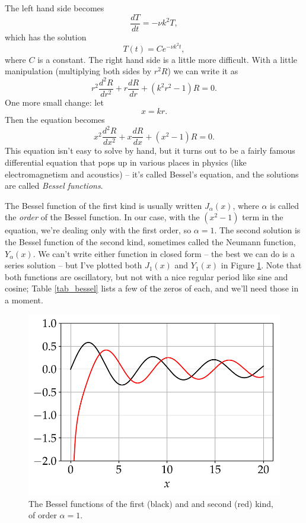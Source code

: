 The left hand side becomes
\[
 \frac{dT}{dt} = -\nu k^2 T,
\]
which has the solution
\begin{equation}
T(t) = C e^{-\nu k^2 t},
\end{equation}
where $C$ is a constant.  The right hand side is a little more difficult.  With a little manipulation (multiplying both sides by $r^2 R$) we can write it as
\[
r^2 \frac{d^2R}{dr^2} + r\frac{dR}{dr} + \left( k^2 r^2 - 1 \right) R = 0.
\]
One more small change:  let 
\[
x = k r.
\]
Then the equation becomes
\begin{equation}
\label{eq_bessel}
x^2 \frac{d^2R}{dx^2} + x\frac{dR}{dx} + \left(  x^2 - 1 \right) R = 0.
\end{equation}
This equation isn't easy to solve by hand, but it turns out to be a fairly famous differential equation that pops up in various places in physics (like electromagnetism and acoustics) -- it's called Bessel's equation, and the solutions are called \emph{Bessel functions}.

The Bessel function of the first kind is usually written $J_\alpha(x)$, where $\alpha$ is called the \emph{order} of the Bessel function.  In our case, with the $(x^2 - 1)$ term in the equation, we're dealing only with the first order, so $\alpha = 1$.  The second solution is the Bessel function of the second kind, sometimes called the Neumann function, $Y_\alpha(x)$.  We can't write either function in closed form -- the best we can do is a series solution -- but I've plotted both $J_1(x)$ and $Y_1(x)$  in Figure \ref{fig_bessel}.  Note that both functions are oscillatory, but not with a nice regular period like sine and cosine; Table \ref{tab_bessel} lists a few of the zeros of each, and we'll need those in a moment.

\begin{figure}
\centering
\includegraphics[width=0.7\linewidth]{Figures/Chapter2/fig_bessel}
\caption{The Bessel functions of the first (black) and and second (red) kind, of order $\alpha = 1$.}
\label{fig_bessel}
\end{figure}

